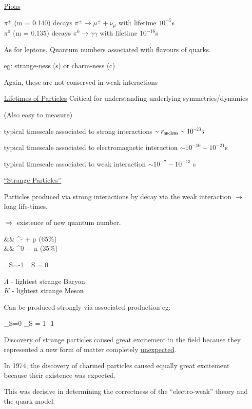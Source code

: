 {\underline{Pions}

\bc
 $\pi^\pm$ (m = 0.140) decays  $\pi^\pm \rightarrow \mu^\pm + \nu_\mu$ with lifetime $10^{-5}$s \\ 
 $\pi^0$  (m = 0.135) decays  $\pi^0 \rightarrow \gamma\gamma$ with lifetime $10^{-16}$s \\ 
\ec

As for leptons, Quantum numbers associated with flavours of quarks. 

eg: strange-ness (s) or charm-ness (c) 

Again, these are not conserved in weak interactions 

\underline{Lifetimes of Particles} Critical for understanding underlying symmetries/dynamics 

(Also easy to measure) 

\bi
\item[-] typical timescale associated to strong interactions $\sim r_{\textrm{nucleus}} \sim 10^{-23}s$
\item[-] typical timescale associated to electromagnetic interaction $\sim 10^{-16} - 10^{-21}$s
\item[-] typical timescale associated to weak interaction $\sim 10^{-7} - 10^{-13}$ s
\ei

\clearpage

\underline{``Strange Particles''}

Particles produced via strong interactions by decay via the weak interaction $\rightarrow$ long life-times.

$\Rightarrow$ existence of new quantum number. 

\bea
\Lambda &\rightarrow& \pi^- + p (65\%)\\
        &\rightarrow& \pi^0 + n (35\%)
\eea

\be
{}_{S=-1} \rightarrow {}_{S = 0}
\ee

$\Lambda$ - lightest strange Baryon \\
$K$ - lightest strange Meson

Can be produced strongly via associated production 
eg:

\be
{}_{S=0} \rightarrow {}_{S = 1  -1}
\ee

Discovery of strange particles caused great excitement in the field because they represented a new form of matter completely \underline{unexpected}.

In 1974, the discovery of charmed particles caused equally great excitement because their existence was expected. 

This was decisive in determining the correctness of the ``electro-weak'' theory and the quark model.   

}


